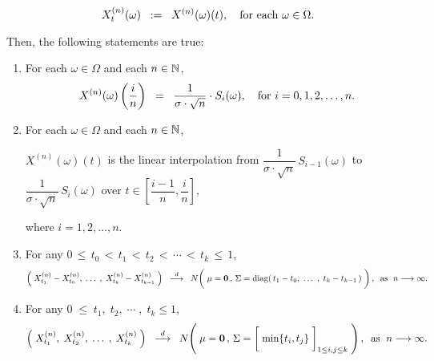 \begin{proposition}
\begin{itemize}
\begin{equation*}
		X^{(n)}_{t}(\omega) \;\; := \;\; X^{(n)}(\omega)(t),
		\quad
		\textnormal{for each $\omega \in \Omega$}.
		\end{equation*}
\end{itemize}
Then, the following statements are true:
\begin{enumerate}
\item	For each $\omega \in \Omega$ and each $n \in \mathbb{N}$,
		\begin{equation*}
		X^{(n)}(\omega)\left(\dfrac{i}{n}\right) \;\; = \;\; \dfrac{1}{\sigma\cdot\sqrt{n}}\cdot S_{i}(\omega),
		\quad
		\textnormal{for $i = 0, 1, 2, \ldots, n$}.
		\end{equation*}
\item	For each $\omega \in \Omega$ and each $n \in \mathbb{N}$, 
		\begin{center}
		$X^{(n)}(\omega)(t)$\; is the linear interpolation
		from \;$\dfrac{1}{\sigma\cdot\sqrt{n}}\,S_{i-1}(\omega)$\;
		to \;$\dfrac{1}{\sigma\cdot\sqrt{n}}\,S_{i}(\omega)$\;
		over \;$t \in \left[\dfrac{i-1}{n},\dfrac{i}{n}\right]$,
		\end{center}
		where $i = 1, 2, \ldots, n$.
\item	For any \;$0 \,\leq\, t_{0} \,<\, t_{1} \,<\, t_{2} \,<\, \cdots \,<\, t_{k} \,\leq\, 1$,
		\begin{equation*}
		\left(\;X^{(n)}_{t_{1}} - X^{(n)}_{t_{0}}, \;\ldots\;,\; X^{(n)}_{t_{k}} - X^{(n)}_{t_{k-1}}\;\right)
		\;\; \overset{d}{\longrightarrow} \;\;
		N\!\left(\;
		\mathbf{\mu} = \mathbf{0}\,,\,
		\overset{{\color{white}1}}{\Sigma} = \diag\!\left(\,t_{1}-t_{0},\; \ldots\; ,\; t_{k}-t_{k-1}\,\right)
		\;\right),
		\;\;
		\textnormal{as \;$n \longrightarrow \infty$}.
		\end{equation*}
\item	For any \;$0 \;\leq\; t_{1},\; t_{2}, \;\cdots\;,\; t_{k} \leq 1$,
		\begin{equation*}
		\left(\;X^{(n)}_{t_{1}},\; X^{(n)}_{t_{2}}, \;\ldots\;,\; X^{(n)}_{t_{k}}\;\right)
		\;\; \overset{d}{\longrightarrow} \;\;
		N\!\left(\;
		\mathbf{\mu} = \mathbf{0}\,,\,
		\Sigma = \left[\;\min\{\overset{{\color{white}1}}{t}_{i},t_{j}\}\;\right]_{1\leq i,j\leq k}
		\;\right),
		\;\;\textnormal{as \;$n \longrightarrow \infty$}.
		\end{equation*}
\end{enumerate}
\end{proposition}
\proof
